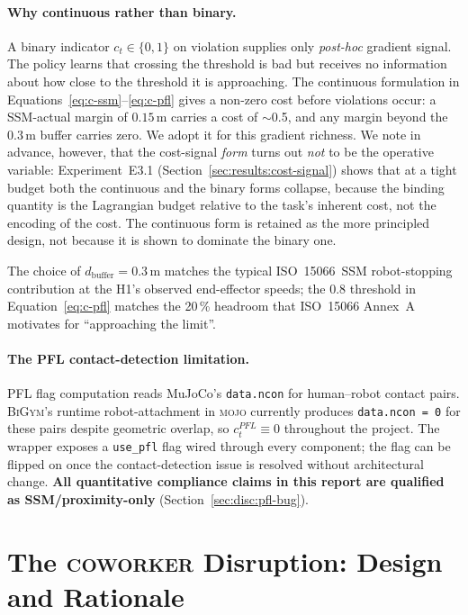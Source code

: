 \documentclass[11pt,a4paper]{report}
\newcommand{\ssm}{SSM}
\newcommand{\pfl}{PFL}
\newcommand{\iso}{ISO~15066}
\newcommand{\bigym}{\textsc{BiGym}}
\newcommand{\coworker}{\textsc{coworker}}
\begin{document}
\paragraph{Why continuous rather than binary.}
A binary indicator $c_t \in \{0,1\}$ on violation supplies only
\emph{post-hoc} gradient signal. The policy learns that crossing
the threshold is bad but receives no information about how close to
the threshold it is approaching. The continuous formulation in
Equations~\ref{eq:c-ssm}--\ref{eq:c-pfl} gives a non-zero cost
before violations occur: a \ssm{}-actual margin of $0.15$\,m carries
a cost of $\sim$0.5, and any margin beyond the $0.3$\,m buffer
carries zero. We adopt it for this gradient richness. We note in
advance, however, that the cost-signal \emph{form} turns out
\emph{not} to be the operative variable: Experiment~E3.1
(Section~\ref{sec:results:cost-signal}) shows that at a tight budget
both the continuous and the binary forms collapse, because the
binding quantity is the Lagrangian budget relative to the task's
inherent cost, not the encoding of the cost. The continuous form is
retained as the more principled design, not because it is shown to
dominate the binary one.

The choice of $d_{\mathrm{buffer}} = 0.3$\,m matches the typical
\iso{}~\ssm{} robot-stopping contribution at the H1's observed
end-effector speeds; the 0.8 threshold in Equation~\ref{eq:c-pfl}
matches the 20\,\% headroom that \iso{} Annex~A motivates for
``approaching the limit''.

\paragraph{The \pfl{} contact-detection limitation.}
\pfl{} flag computation reads MuJoCo's \texttt{data.ncon} for
human--robot contact pairs. \bigym{}'s runtime robot-attachment in
\textsc{mojo} currently produces \texttt{data.ncon = 0} for these
pairs despite geometric overlap, so $c^{\pfl}_t \equiv 0$ throughout
the project. The wrapper exposes a \texttt{use\_pfl} flag wired
through every component; the flag can be flipped on once the
contact-detection issue is resolved without architectural change.
\textbf{All quantitative compliance claims in this report are
qualified as \ssm{}/proximity-only}
(Section~\ref{sec:disc:pfl-bug}).

\section{The \coworker{} Disruption: Design and Rationale}
\label{sec:bench:coworker}
\end{document}

